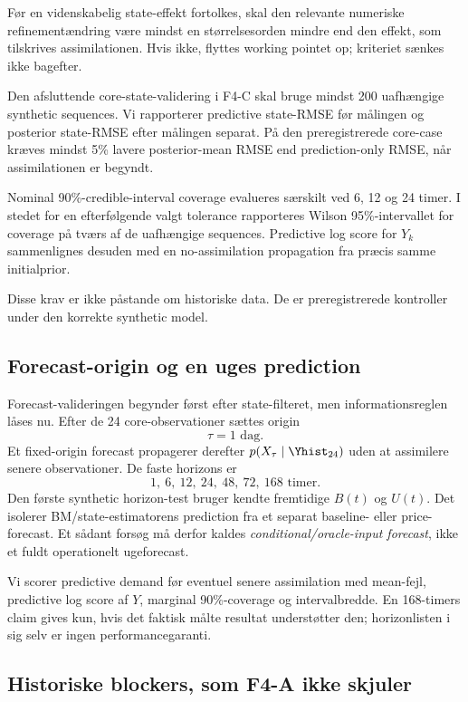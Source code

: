 Før en videnskabelig state-effekt fortolkes, skal den relevante numeriske
refinementændring være mindst en størrelsesorden mindre end den effekt, som tilskrives
assimilationen. Hvis ikke, flyttes working pointet op; kriteriet sænkes ikke bagefter.

Den afsluttende core-state-validering i F4-C skal bruge mindst 200 uafhængige synthetic
sequences. Vi rapporterer predictive state-RMSE før målingen og posterior state-RMSE
efter målingen separat. På den preregistrerede core-case kræves mindst 5\% lavere
posterior-mean RMSE end prediction-only RMSE, når assimilationen er begyndt.

Nominal 90\%-credible-interval coverage evalueres særskilt ved 6, 12 og 24 timer.
I stedet for en efterfølgende valgt tolerance rapporteres Wilson 95\%-intervallet for
coverage på tværs af de uafhængige sequences. Predictive log score for \(Y_k\) sammenlignes
desuden med en no-assimilation propagation fra præcis samme initialprior.

Disse krav er ikke påstande om historiske data. De er preregistrerede kontroller under
den korrekte synthetic model.

\subsection{Forecast-origin og en uges prediction}

Forecast-valideringen begynder først efter state-filteret, men informationsreglen låses nu.
Efter de 24 core-observationer sættes origin
\[
 \tau=1\text{ dag}.
\]
Et fixed-origin forecast propagerer derefter \(p(X_\tau\mid\Yhist_{24})\) uden at
assimilere senere observationer. De faste horizons er
\[
 1,\ 6,\ 12,\ 24,\ 48,\ 72,\ 168\text{ timer}.
\]
Den første synthetic horizon-test bruger kendte fremtidige \(B(t)\) og \(U(t)\). Det
isolerer BM/state-estimatorens prediction fra et separat baseline- eller price-forecast.
Et sådant forsøg må derfor kaldes \emph{conditional/oracle-input forecast}, ikke et fuldt
operationelt ugeforecast.

Vi scorer predictive demand før eventuel senere assimilation med mean-fejl,
predictive log score af \(Y\), marginal 90\%-coverage og intervalbredde. En 168-timers
claim gives kun, hvis det faktisk målte resultat understøtter den; horizonlisten i sig
selv er ingen performancegaranti.

\subsection{Historiske blockers, som F4-A ikke skjuler}

